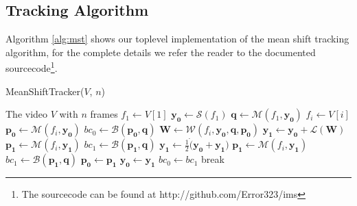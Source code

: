 \documentclass[11pt]{article}
\begin{document}
\subsection{Tracking Algorithm} \label{sec:mst}
Algorithm \ref{alg:mst} shows our toplevel implementation of the mean shift
tracking algorithm, for the complete details we refer the reader to the
documented sourcecode\footnote{The sourcecode can be found at http://github.com/Error323/ims}.
\begin{algorithm}
	\caption{MeanShiftTracker($V$, $n$)}
	\begin{algorithmic}[1]
	\REQUIRE The video $V$ with $n$ frames
	\STATE $f_1 \leftarrow V[1]$ 
	\STATE $\mathbf{y_0} \leftarrow \mathcal{S}(f_1)$ 
	\STATE $\mathbf{q} \leftarrow \mathcal{M}(f_1, \mathbf{y_0})$ 
		\STATE $f_i \leftarrow V[i]$
		\STATE $\mathbf{p_0} \leftarrow \mathcal{M}(f_i, \mathbf{y_0})$
		\STATE $bc_0 \leftarrow \mathcal{B}(\mathbf{p_0}, \mathbf{q})$ 
			\STATE $\mathbf{W} \leftarrow \mathcal{W}(f_i, \mathbf{y_0}, \mathbf{q}, \mathbf{p_0})$ 
			\STATE $\mathbf{y_1} \leftarrow \mathbf{y_0} + \mathcal{L}(\mathbf{W})$ 
			\STATE $\mathbf{p_1} \leftarrow \mathcal{M}(f_i, \mathbf{y_1})$
			\STATE $bc_1 \leftarrow \mathcal{B}(\mathbf{p_1}, \mathbf{q})$
				\STATE $\mathbf{y_1} \leftarrow \frac{1}{2} \dot (\mathbf{y_0} + \mathbf{y_1})$ 
				\STATE $\mathbf{p_1} \leftarrow \mathcal{M}(f_i, \mathbf{y_1})$
				\STATE $bc_1 \leftarrow \mathcal{B}(\mathbf{p_1}, \mathbf{q})$
			\ENDWHILE
			\STATE $\mathbf{p_0} \leftarrow \mathbf{p_1}$
			\STATE $\mathbf{y_0} \leftarrow \mathbf{y_1}$
			\STATE $bc_0 \leftarrow bc_1$
				\STATE break 
			\ENDIF
		\ENDWHILE
	\ENDFOR
	\medskip
	\end{algorithmic}
\label{alg:mst}
\end{algorithm}


\newpage
\end{document}
